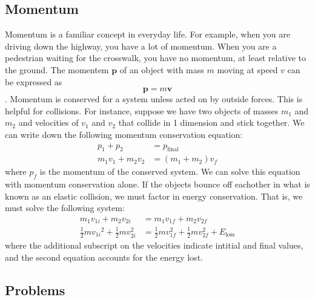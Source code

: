 \documentclass[titlepage]{article}
\begin{document}
\subsection{Momentum}
Momentum is a familiar concept in everyday life. For example, when you are driving down the highway, you have a lot of momentum. When you are a pedestrian waiting for the crosswalk, you have no momentum, at least relative to the ground. The momentem $\mathbf{p}$ of an object with mass $m$ moving at speed $v$ can be expressed as
\begin{equation}
    \mathbf{p} = m\mathbf{v}
\end{equation}.
Momentum is conserved for a system unless acted on by outside forces. This is helpful for collisions. For instance, suppose we have two objects of masses $m_1$ and $m_2$ and velocities of $v_1$ and $v_2$ that collide in 1 dimension and stick together. We can write down the following momentum conservation equation:
\begin{align}
    p_1 + p_2 &= p_{\textrm{final}}\\
    m_1 v_1 + m_2 v_2 &= (m_1 + m_2) v_f
\end{align}
where $p_f$ is the momentum of the conserved system. We can solve this equation with momentum conservation alone. If the objects bounce off eachother in what is known as an elastic collision,
we must factor in energy conservation. That is, we must solve the following system:
\begin{align}
    m_1 v_{1i} + m_2 v_{2i} &= m_1 v_{1f} + m_2 v_{2f} \\
    \frac{1}{2} m {v_{1i}}^2 + \frac{1}{2} mv_{2i}^2 &= \frac{1}{2} mv_{1f}^2 + \frac{1}{2} mv_{2f}^2 + E_{\textrm{loss}}
\end{align}
where the additional subscript on the velocities indicate intitial and final values, and the second equation accounts for the energy lost. 



\subsection{Problems}
\end{document}
